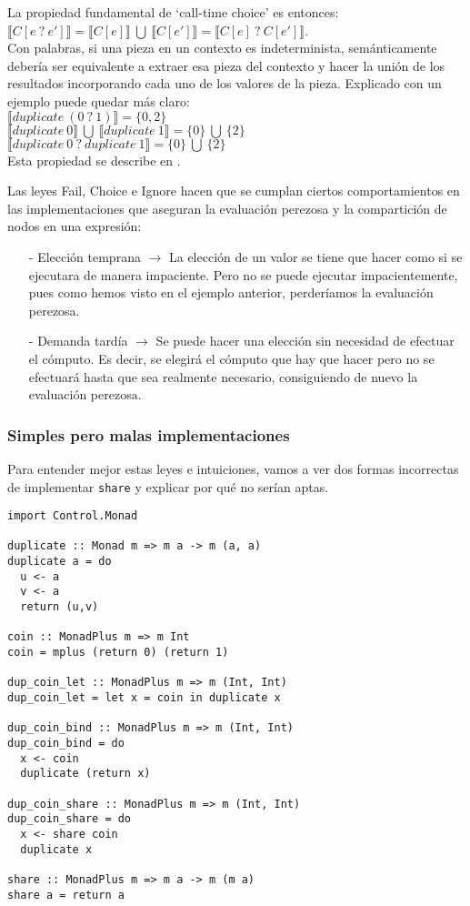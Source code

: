 \documentclass[class=article, crop=false]{standalone}
\begin{document}
La propiedad fundamental de `call-time choice' es entonces: \\
$\llbracket C[e \: ? \: e']\rrbracket
=\llbracket C[e]\rrbracket \:\bigcup\: \llbracket C[e']\rrbracket
=\llbracket C[e] \:?\: C[e']\rrbracket$. \\
Con palabras, si una pieza en un contexto es
indeterminista, semánticamente debería ser equivalente a extraer esa pieza del contexto y
hacer la unión de los resultados incorporando cada uno de los valores de la pieza. Explicado
con un ejemplo puede quedar más claro: \\
$\llbracket duplicate \: (0 \: ? \: 1)\rrbracket = \{0, 2\}$ \\
$\llbracket duplicate \:0\rrbracket\:\bigcup\:\llbracket duplicate \: 1\rrbracket
=\{0\} \:\bigcup\: \{2\}$ \\
$\llbracket duplicate \:0 \:?\: duplicate \:1\rrbracket = \{0\} \:\bigcup\: \{2\}$ \\
Esta propiedad se describe en \cite{lopez2007simple}.

Las leyes Fail, Choice e Ignore hacen que se cumplan ciertos comportamientos en las
implementaciones que aseguran la evaluación perezosa y la compartición de nodos en una
expresión:

\begin{itemize}
  \item[-] Elección temprana $\rightarrow$ La elección de un valor se tiene que hacer como si
  se ejecutara de manera impaciente. Pero no se puede ejecutar impacientemente, pues como
  hemos visto en el ejemplo anterior, perderíamos la evaluación perezosa.
  \item[-] Demanda tardía $\rightarrow$ Se puede hacer una elección sin necesidad de efectuar
  el cómputo. Es decir, se elegirá el cómputo que hay que hacer pero no se efectuará hasta
  que sea realmente necesario, consiguiendo de nuevo la evaluación perezosa.
\end{itemize}

\subsubsection{Simples pero malas implementaciones}
Para entender mejor estas leyes e intuiciones, vamos a ver dos formas incorrectas de
implementar \verb`share` y explicar por qué no serían aptas.

\begin{verbatim}  
import Control.Monad

duplicate :: Monad m => m a -> m (a, a)
duplicate a = do
  u <- a
  v <- a
  return (u,v)

coin :: MonadPlus m => m Int
coin = mplus (return 0) (return 1)

dup_coin_let :: MonadPlus m => m (Int, Int)
dup_coin_let = let x = coin in duplicate x

dup_coin_bind :: MonadPlus m => m (Int, Int)
dup_coin_bind = do
  x <- coin
  duplicate (return x)

dup_coin_share :: MonadPlus m => m (Int, Int)
dup_coin_share = do
  x <- share coin
  duplicate x

share :: MonadPlus m => m a -> m (m a)
share a = return a
\end{verbatim}
\end{document}

